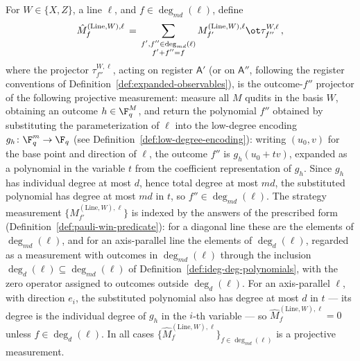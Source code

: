 \begin{definition}
	\label{def:expanded-line-measurement}
	\leanok
	For $W \in \{X,Z\}$, a line $\ell$, and $f \in \deg_{md}(\ell)$,
	define
	\[
		\hat{M}^{(\mathrm{Line},W),\ell}_f
		\,=\, \sum_{\substack{f',f'' \in \deg_{md}(\ell) \\ f' + f'' = f}}
		M^{(\mathrm{Line},W),\ell}_{f'} \ot \tau^{W,\ell}_{f''}\,,
	\]
	where the projector $\tau^{W,\ell}_{f''}$, acting on register
	$\mathsf{A}'$ (or on $\mathsf{A}''$, following the register conventions
	of Definition~\ref{def:expanded-observables}), is the outcome-$f''$
	projector of the following projective measurement: measure all $M$
	qudits in the basis $W$, obtaining an outcome $h \in \F_q^{M}$, and
	return the polynomial $f''$ obtained by substituting the
	parameterization of $\ell$ into the low-degree encoding
	$g_h \colon \F_q^m \to \F_q$
	(see Definition~\ref{def:low-degree-encoding}): writing $(u_0,v)$ for
	the base point and direction of $\ell$, the outcome $f''$ is
	$g_h(u_0 + tv)$, expanded as a polynomial in the variable $t$ from the
	coefficient representation of $g_h$. Since $g_h$ has individual degree
	at most $d$, hence total degree at most $md$, the substituted
	polynomial has degree at most $md$ in $t$, so
	$f'' \in \deg_{md}(\ell)$. The strategy measurement
	$\{M^{(\mathrm{Line},W),\ell}_{f'}\}$ is indexed by the answers of the
	prescribed form (Definition~\ref{def:pauli-win-predicate}): for a
	diagonal line these are the elements of $\deg_{md}(\ell)$, and for an
	axis-parallel line the elements of $\deg_d(\ell)$, regarded as a
	measurement with outcomes in $\deg_{md}(\ell)$ through the inclusion
	$\deg_d(\ell) \subseteq \deg_{md}(\ell)$ of
	Definition~\ref{def:ideg-deg-polynomials}, with the zero operator
	assigned to outcomes outside $\deg_d(\ell)$. For an axis-parallel
	$\ell$, with direction $e_i$, the substituted polynomial also has
	degree at most $d$ in $t$ --- its degree is the individual degree of
	$g_h$ in the $i$-th variable --- so
	$\hat{M}^{(\mathrm{Line},W),\ell}_f = 0$ unless $f \in \deg_d(\ell)$.
	In all cases
	$\{\hat{M}^{(\mathrm{Line},W),\ell}_f\}_{f \in \deg_{md}(\ell)}$ is a
	projective measurement.
\end{definition}

